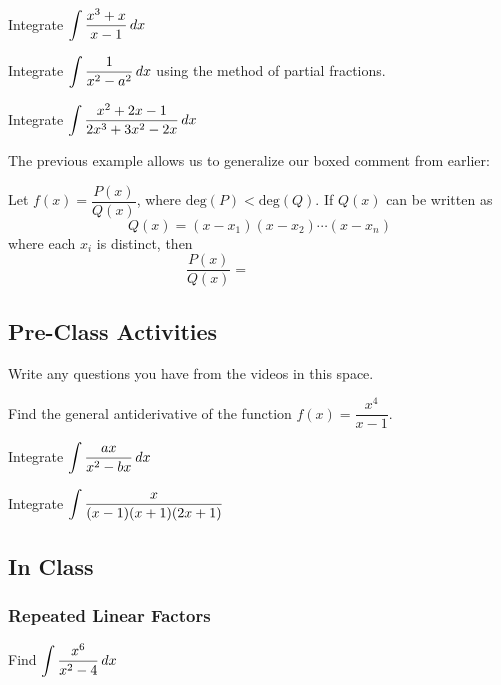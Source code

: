 \documentclass[notes]{subfiles}
\begin{document}
		\begin{ex}
			Integrate $\displaystyle \int \dfrac{x^3 + x}{x-1}\, dx$
		\end{ex}
			\newpage
		
		\begin{ex}
			Integrate $\displaystyle \int \dfrac{1}{x^2-a^2}\, dx$ using the method of partial fractions.
		\end{ex}	
			
		\begin{ex}
			Integrate $\displaystyle \int \dfrac{x^2+2x-1}{2x^3+3x^2-2x}\, dx$
		\end{ex}
			\newpage
			
		The previous example allows us to generalize our boxed comment from earlier:
		\begin{rmk}
			Let $f(x) = \dfrac{P(x)}{Q(x)}$, where $\text{deg}(P) < \text{deg}(Q)$.  If $Q(x)$ can be written as 
				\[Q(x) = (x-x_1)(x-x_2)\cdots(x-x_n)\]
			where each $x_i$ is distinct, then 
				\[\dfrac{P(x)}{Q(x)} = \qquad \qquad\qquad\]
		\end{rmk}
		\newsec
	\subsection*{Pre-Class Activities}
		\begin{ex}
			Write any questions you have from the videos in this space.
		\end{ex}
		\begin{ex}
			Find the general antiderivative of the function $f(x) = \dfrac{x^4}{x-1}$.
		\end{ex}
			\newpage
		
		\begin{ex}
			Integrate $\displaystyle \int \dfrac{ax}{x^2-bx}\, dx$
		\end{ex}
			
		\begin{ex}
			Integrate $\displaystyle \int \dfrac{x}{(x-1)(x+1)(2x+1)}$
		\end{ex}
			\newpage
			
	\subsection*{In Class}
	\subsubsection*{Repeated Linear Factors}
		\begin{ex}
			Find $\displaystyle \int \dfrac{x^6}{x^2-4}\, dx$
		\end{ex}
			
\end{document}
